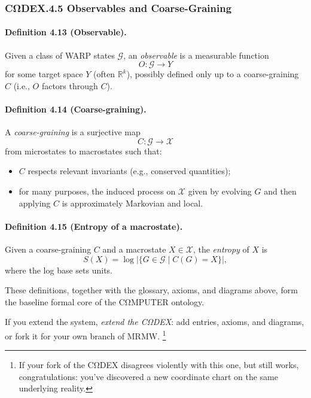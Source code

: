 \subsubsection*{CΩDEX.4.5 \quad Observables and Coarse-Graining}

\paragraph{Definition 4.13 (Observable).}
Given a class of WARP states $\mathcal{G}$, an \emph{observable} is a
measurable function
\[
  O : \mathcal{G} \to Y
\]
for some target space $Y$ (often $\mathbb{R}^k$), possibly defined only
up to a coarse-graining $C$ (i.e., $O$ factors through $C$).

\paragraph{Definition 4.14 (Coarse-graining).}
A \emph{coarse-graining} is a surjective map
\[
  C : \mathcal{G} \to \mathcal{X}
\]
from microstates to macrostates such that:

\begin{itemize}
  \item $C$ respects relevant invariants (e.g., conserved quantities);
  \item for many purposes, the induced process on $\mathcal{X}$ given by
        evolving $G$ and then applying $C$ is approximately Markovian
        and local.
\end{itemize}

\paragraph{Definition 4.15 (Entropy of a macrostate).}
Given a coarse-graining $C$ and a macrostate $X \in \mathcal{X}$, the
\emph{entropy} of $X$ is
\[
  S(X) = \log \left|\{ G \in \mathcal{G} \mid C(G) = X \}\right|,
\]
where the log base sets units.

\medskip

These definitions, together with the glossary, axioms, and diagrams above,
form the baseline formal core of the CΩMPUTER ontology.

If you extend the system, \emph{extend the CΩDEX}: add entries, axioms,
and diagrams, or fork it for your own branch of MRMW.%
\footnote{If your fork of the CΩDEX disagrees violently with this one,
but still works, congratulations: you’ve discovered a new coordinate
chart on the same underlying reality.}
